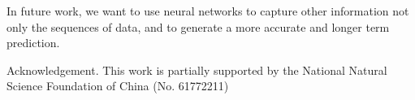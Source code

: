 \documentclass[runningheads]{llncs}
\begin{document}
In future work, we want to use neural networks to capture other information not only the sequences of data, and to generate a more accurate and longer term prediction.

Acknowledgement. This work is partially supported by the National Natural Science Foundation of China (No. 61772211)

%
%
%
% 
% 
%


\end{document}
